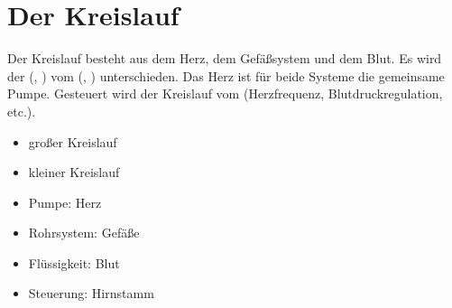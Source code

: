 \clearpage %
\section{Der Kreislauf }
\label{topic:blutkreislauf} 

{Der Kreislauf besteht aus dem Herz, dem Gefäßsystem und dem Blut.
Es wird der  (, ) vom
 (,
) unterschieden. Das Herz ist für 
beide Systeme die gemeinsame Pumpe.
Gesteuert wird der Kreislauf vom 
(Herzfrequenz, Blutdruckregulation, etc.).

}
{
\begin{itemize}
  \item großer Kreislauf
  \item kleiner Kreislauf
  \item Pumpe: Herz
  \item Rohrsystem: Gefäße
  \item Flüssigkeit: Blut
  \item Steuerung: Hirnstamm
\end{itemize}
}
{}{}{}



